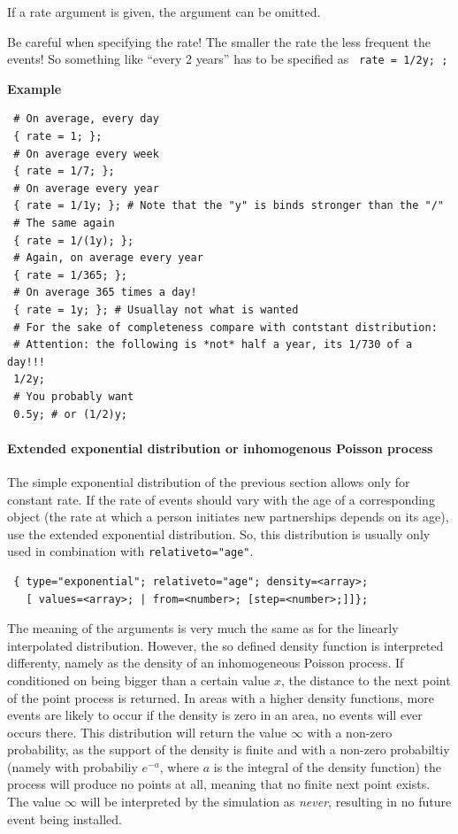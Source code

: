 \documentclass[11pt]{article}
\newenvironment{example}{\par\smallskip\noindent\begingroup\small\textbf{\small Example\enskip}}{\endgroup\par\smallskip}
\begin{document}
If a rate argument is given, the  argument can be
omitted.

Be careful when specifying the rate! The smaller the rate the less frequent the
events! So something like ``every 2 years'' has to be specified as
\texttt{ rate = 1/2y; ;}
\begin{example}
\begin{verbatim}
 # On average, every day
 { rate = 1; };
 # On average every week
 { rate = 1/7; };
 # On average every year
 { rate = 1/1y; }; # Note that the "y" is binds stronger than the "/"
 # The same again
 { rate = 1/(1y); };
 # Again, on average every year
 { rate = 1/365; };
 # On average 365 times a day!
 { rate = 1y; }; # Usuallay not what is wanted
 # For the sake of completeness compare with contstant distribution:
 # Attention: the following is *not* half a year, its 1/730 of a day!!! 
 1/2y; 
 # You probably want
 0.5y; # or (1/2)y;
\end{verbatim}
\end{example}

\paragraph{Extended exponential distribution or inhomogenous Poisson
process}

The simple exponential distribution of the previous section allows only for
constant rate. If the rate of events should vary with the age of a
corresponding object (the rate at which a person initiates new partnerships
depends on its age), use the extended exponential distribution. So, this
distribution is usually only used in combination with \texttt{relativeto="age"}.
\begin{verbatim}
 { type="exponential"; relativeto="age"; density=<array>; 
   [ values=<array>; | from=<number>; [step=<number>;]]};
\end{verbatim}
The meaning of the arguments is very much the same as for the linearly
interpolated distribution. However, the so defined density function is
interpreted differenty, namely as the density of an inhomogeneous Poisson
process. If conditioned on being bigger than a certain value $x$, the distance
to the next point of the point process is returned. In areas with a higher
density functions, more events are likely to occur if the density is zero in an
area, no events will ever occurs there. This distribution will return the value
$\infty$ with a non-zero probability, as the support of the density is finite
and with a non-zero probabiltiy (namely with probabiliy $e^{-a}$, where $a$ is
the integral of the density function) the process will produce no points at
all, meaning that no finite next point exists. The value $\infty$ will be
interpreted by the simulation as \emph{never}, resulting in no future event
being installed. 
\end{document}
